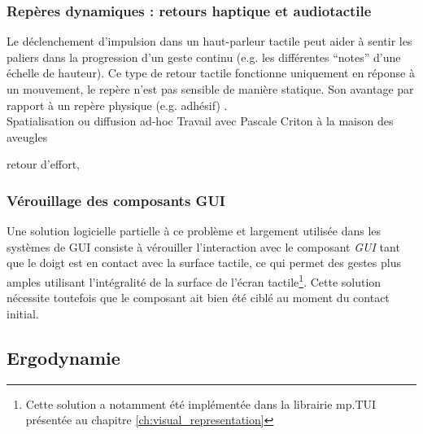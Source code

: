 \subsubsection{Repères dynamiques : retours haptique et audiotactile}

\label{sec:audio-fretting}
\noindent Le déclenchement d'impulsion dans un haut-parleur tactile peut aider à sentir les paliers dans la progression d'un geste continu (e.g. les différentes ``notes'' d'une échelle de hauteur). Ce type de retour tactile fonctionne uniquement en réponse à un mouvement, le repère n'est pas sensible de manière statique. Son avantage par rapport à un repère physique (e.g. adhésif) .\\

Spatialisation ou diffusion ad-hoc
Travail avec Pascale Criton à la maison des aveugles

retour d'effort,

\subsubsection{Vérouillage des composants GUI}
\noindent Une solution logicielle partielle à ce problème et largement utilisée dans les systèmes de \gls{GUI} consiste à vérouiller l'interaction avec le composant \textit{GUI} tant que le doigt est en contact avec la surface tactile, ce qui permet des gestes plus amples utilisant l'intégralité de la surface de l'écran tactile\footnote{Cette solution a notamment été implémentée dans la librairie mp.TUI présentée au chapitre \ref{ch:visual_representation}}. Cette solution nécessite toutefois que le composant ait bien été ciblé au moment du contact initial.

\subsection{Ergodynamie}

